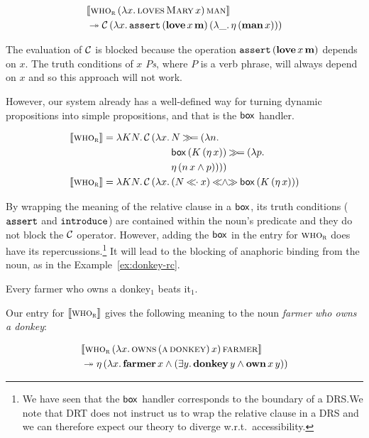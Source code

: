 \begin{align*}
& \llbracket \textsc{who}_{\textsc{r}}\,(\lambda x.\, \textsc{loves}\,\textsc{Mary}\,x)\,\textsc{man} \rrbracket \\
& \twoheadrightarrow \mathcal{C}\,(\lambda x.\, \mathtt{assert}\,(\textbf{love}\,x\,\textbf{m})\,(\lambda \_.\, \eta\,(\textbf{man}\,x)))
\end{align*}

The evaluation of $\mathcal{C}$ is blocked because the operation
$\mathtt{assert}\,(\textbf{love}\,x\,\textbf{m})$ depends on $x$. The
truth conditions of \emph{$x$ $P$s}, where $P$ is a verb phrase, will
always depend on $x$ and so this approach will not work.

However, our system already has a well-defined way for turning dynamic
propositions into simple propositions, and that is the $\mathsf{box}$ handler.

\begin{align*}
  \sem{\abs{who}_{\abs{r}}} = \lam{K N}{\ap{\CC}{(\lam{x}{
    &N \hsbind (\lam{n}{ \\
    &\ap{\BOX}{(\ap{K}{(\etaE{x})})} \hsbind (\lam{p}{ \\
    &\etaE{(\ap{n}{x} \land p)}})})})}} \\
  \sem{\abs{who}_{\abs{r}}} = \lam{K N}{\ap{\CC}{(\lam{x}{
    &(N \apl x) \andlr \ap{\BOX}{(\ap{K}{(\etaE{x})})}})}}
\end{align*}

By wrapping the meaning of the relative clause in a $\mathsf{box}$, its truth
conditions ($\mathtt{assert}$ and $\mathtt{introduce}$) are contained within the
noun's predicate and they do not block the $\mathcal{C}$ operator. However, adding
the $\mathsf{box}$ in the entry for $\textsc{who}_{\textsc{r}}$ does have its
repercussions.\footnote{We have seen that the $\mathsf{box}$ handler corresponds to
  the boundary of a DRS.\@ We note that DRT does not instruct us to wrap
  the relative clause in a DRS and we can therefore expect our theory to
  diverge w.r.t.\ accessibility.} It will lead to the blocking of anaphoric
binding from the noun, as in the Example~\ref{ex:donkey-rc}.

\begin{exe}
   Every farmer who owns a donkey$_1$ beats it$_1$.
\end{exe}

Our entry for $\llbracket \textsc{who}_{\textsc{r}} \rrbracket$ gives the following meaning to
the noun \emph{farmer who owns a donkey}:

\begin{align*}
& \llbracket \textsc{who}_{\textsc{r}}\,(\lambda x.\, \textsc{owns}\,(\textsc{a}\,\textsc{donkey})\,x)\,\textsc{farmer} \rrbracket \\
& \twoheadrightarrow \eta\,(\lambda x.\, \textbf{farmer}\,x \land (\exists y.\, \textbf{donkey}\,y \land \textbf{own}\,x\,y))
\end{align*}

